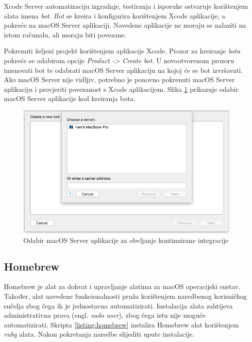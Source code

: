 \documentclass[times, utf8, diplomski, numeric]{fer}
\newcommand{\eng}[1]{(engl. \textit{#1})}
\begin{document}
Xcode Server automatizaciju izgradnje, testiranja i isporuke ostvaruje korištenjem alata imena \textit{bot}. \textit{Bot} se kreira i konfigurira korištenjem Xcode aplikacije, a pokreće na macOS Server aplikaciji. Navedene aplikacije ne moraju se nalaziti na istom računalu, ali moraju biti povezane.

Pokrenuti željeni projekt korištenjem aplikacije Xcode. Prozor za kreiranje \textit{bota} pokreće se odabirom opcije \textit{Product -> Create bot}. U novootvorenom prozoru imenovati bot te odabrati macOS Server aplikaciju na kojoj će se bot izvršavati. Ako macOS Server nije vidljiv, potrebno je ponovno pokrenuti macOS Server aplikaciju i provjeriti povezanost s Xcode aplikacijom. Slika \ref{fig:BotServerSelection} prikazuje odabir macOS Server aplikacije kod kreiranja bota.

\begin{figure}
\centering
\includegraphics[scale=0.4]{BotServerSelection}
\caption{Odabir macOS Server aplikacije za obvljanje kontinuirane integracije}
\label{fig:BotServerSelection}
\end{figure}

\subsection{Homebrew}

Homebrew je alat za dohvat i upravljanje alatima za macOS operacijski sustav\citep{homebrew}. Također, alat navedene funkcionalnosti pruža korištenjem naredbenog korisničkog sučelja zbog čega ih je jednostavno automatizirati. Instalacija alata zahtijeva administrativna prava \eng{sudo user}, zbog čega istu nije moguće automatizirati. Skripta \ref{listing:homebrew} instalira Homebrew alat korištenjem \textit{ruby} alata. Nakon pokretanja naredbe slijediti upute instalacije.
\end{document}
